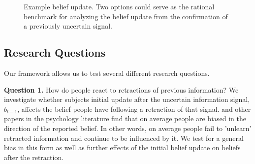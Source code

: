 \documentclass{article}
\begin{document}
\begin{figure}[!htb]
\centering
{}
\caption{\small{Example belief update. Two options could serve as the rational benchmark for analyzing the belief update from the confirmation of a previously uncertain signal.}}
\label{fig:example_confirmation}
\end{figure}


\subsection{Research Questions}
Our framework allows us to test several different research questions. 

\textbf{Question 1.} How do people react to retractions of previous information? We investigate whether subjects initial update after the uncertain information signal, $b_{t-1}$, affects the belief people have following a retraction of that signal. \cite{Goncalves2022} and other papers in the psychology literature find that on average people are biased in the direction of the reported belief. In other words, on average people fail to 'unlearn' retracted information and continue to be influenced by it. We test for a general bias in this form as well as further effects of the initial belief update on beliefs after the retraction.
\end{document}
